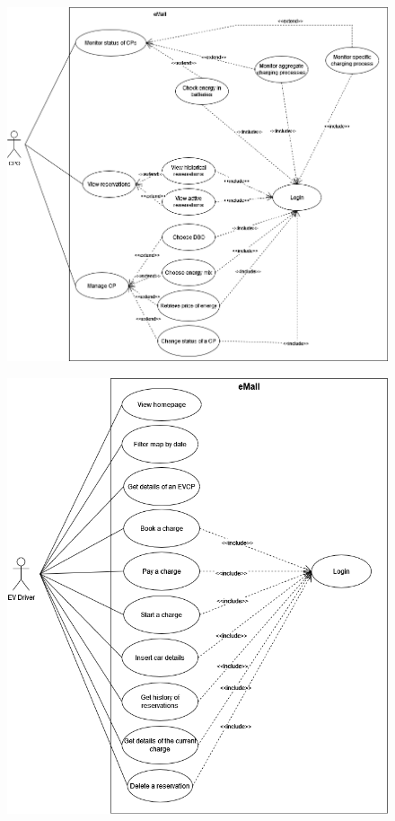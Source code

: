 \begin{figure}[H]
    \centering
    \includegraphics[scale=0.5]{src/use_case_diagram/cpo.png}
\end{figure}

\begin{figure}[H]
    \centering
    \includegraphics[scale=0.6]{src/use_case_diagram/driver.png}
\end{figure}

